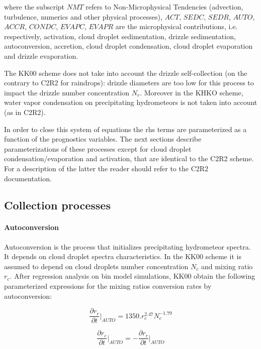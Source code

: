 \noindent where the subscript $NMT$ refers to Non-Microphysical Tendencies (advection, turbulence, numerics and other physical processes), $ACT$, $SEDC$, $SEDR$, $AUTO$, $ACCR$, $CONDC$, $EVAPC$, $EVAPR$ are the microphysical contributions, i.e. respectively, activation, cloud droplet sedimentation, drizzle sedimentation, autoconversion, accretion, cloud droplet condensation, cloud droplet evaporation and drizzle evaporation. 

\noindent The KK00 scheme does not take into account the drizzle self-collection (on the contrary to C2R2 for raindrops): drizzle diameters are too low for this process to impact the drizzle number concentration $N_r$. Moreover in the KHKO scheme, water vapor condensation on precipitating hydrometeors is not taken into account (as in C2R2).

\noindent In order to close this system of equations the rhs terms are parameterized as a function of the prognostics variables. The next sections describe parameterizations of these processes except for cloud droplet condensation/evaporation and activation, that are identical to the C2R2 scheme. For a description of the latter the reader should refer to the C2R2 documentation.

\subsection{Collection processes}

\paragraph{Autoconversion}

Autoconversion is the process that initializes precipitating hydrometeor spectra. It depends on cloud droplet spectra characteristics. In the KK00 scheme it is assumed to depend on cloud droplets number concentration $N_c$ and mixing ratio $r_c$. After regression analysis on bin model simulations, KK00 obtain the following parameterized expressions for the mixing ratios conversion rates by autoconversion: 

\begin{equation}
\frac{\displaystyle{\partial r_r}}{\displaystyle{\partial t}} \Big|_{AUTO}=1350. r_c^{2.47}N_c^{-1.79}
\label{autoc}
\end{equation}

\begin{equation}
\frac{\displaystyle{\partial r_c}}{\displaystyle{\partial t}} \Big|_{AUTO}=
-\frac{\displaystyle{\partial r_r}}{\displaystyle{\partial t}} \Big|_{AUTO}
\end{equation}


